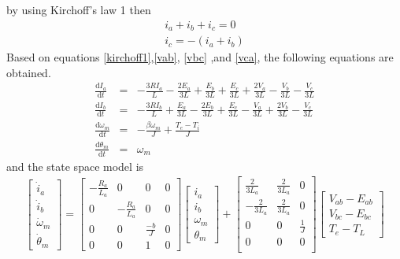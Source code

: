 by using Kirchoff's law 1 then 
\begin{eqnarray}
    i_a + i_b + i_c = 0 \\
    i_c = -(i_a + i_b)\label{kirchoff1}
\end{eqnarray}
Based on equations \eqref{kirchoff1},\eqref{vab}, \eqref{vbc} ,and \eqref{vca}, the following equations are obtained.
\begin{eqnarray}
    \frac{\text{d}I_a}{\text{d}t} &=& -\frac{3RI_a}{L} - \frac{2E_a}{3L} + \frac{E_b}{3L} + \frac{E_c}{3L} + \frac{2V_a}{3L} - \frac{V_b}{3L} - \frac{V_c}{3L}\\
    \frac{\text{d}I_b}{\text{d}t} &=& -\frac{3RI_b}{L} + \frac{E_a}{3L} - \frac{2E_b}{3L} + \frac{E_c}{3L} - \frac{V_a}{3L} + \frac{2V_b}{3L} - \frac{V_c}{3L}\\
    \frac{\text{d}\omega_m}{\text{d}t} &=& -\frac{\beta\omega_m}{J} + \frac{T_e - T_i}{J}\\
    \frac{\text{d}\theta_m}{\text{d}t} &=& \omega_m
\end{eqnarray}
and the state space model is 
    \begin{eqnarray}
        \begin{bmatrix}
            \dot{i}{_a}\\
            \dot{i}{_b}\\
            \dot{\omega}{_m}\\
            \dot{\theta}{_m}
        \end{bmatrix} = 
        \begin{bmatrix}
            -\frac{R_a}{L_a} & 0 & 0 & 0\\
            0 & -\frac{R_a}{L_a} & 0 & 0\\
            0 & 0 & \frac{-b}{J} & 0 \\
            0 & 0 & 1 & 0 
        \end{bmatrix}
        \begin{bmatrix}
            i_a \\
            i_b\\
            \omega_m\\
            \theta_m
        \end{bmatrix}   
        + \begin{bmatrix}
            \frac{2}{3L_a} & \frac{2}{3L_a} & 0 \\
            -\frac{2}{3L_a} & \frac{2}{3L_a} & 0\\
            0&0&\frac{1}{J}\\
            0&0&0\\
        \end{bmatrix}
        \begin{bmatrix}
            V_{ab} - E_{ab} \\
            V_{bc} - E_{bc}\\
            T_e - T_L
        \end{bmatrix}
    \end{eqnarray} 

